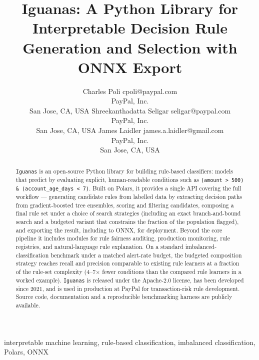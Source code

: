 \documentclass[twoside,11pt]{article}
\begin{document}
\title{Iguanas: A Python Library for Interpretable Decision Rule
Generation and Selection with ONNX Export}

\author{\name Charles Poli \email cpoli@paypal.com \\
       \addr PayPal, Inc.\\
       San Jose, CA, USA
       \AND
       \name Shreekanthadatta Seligar \email seligar@paypal.com \\
       \addr PayPal, Inc.\\
       San Jose, CA, USA
       \AND
       \name James Laidler \email james.a.laidler@gmail.com \\
       \addr PayPal, Inc.\\
       San Jose, CA, USA
}

\maketitle

\begin{abstract}
\texttt{Iguanas} is an open-source Python library for building rule-based
classifiers: models that predict by evaluating explicit, human-readable
conditions such as \texttt{(amount > 500) \& (account\_age\_days < 7)}. Built on
Polars, it provides a single API covering the full workflow --- generating
candidate rules from labelled data by extracting decision paths from
gradient-boosted tree ensembles, scoring and filtering candidates, composing a
final rule set under a choice of search strategies (including an exact
branch-and-bound search and a budgeted variant that constrains the fraction of
the population flagged), and exporting the result, including to ONNX, for
deployment. Beyond the core pipeline it includes modules for rule fairness
auditing, production monitoring, rule registries, and natural-language rule
explanation. On a standard imbalanced-classification benchmark under a
matched alert-rate budget, the budgeted composition strategy reaches recall
and precision comparable to existing rule learners at a fraction of the
rule-set complexity (4--7$\times$ fewer conditions than the compared rule
learners in a worked example). \texttt{Iguanas} is released under the
Apache-2.0 license, has been developed since 2021, and is used in production
at PayPal for transaction-risk rule development. Source code, documentation
and a reproducible benchmarking harness are publicly available.
\end{abstract}

\begin{keywords}
  interpretable machine learning, rule-based classification, imbalanced
  classification, Polars, ONNX
\end{keywords}
\end{document}
